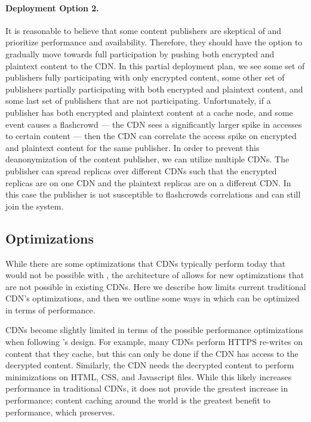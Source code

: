 \paragraph{Deployment Option 2.} 
It is reasonable to believe that some content publishers are skeptical of \system{} and prioritize performance 
and availability.  Therefore, they should have the option to gradually move towards full participation by pushing 
both encrypted and plaintext content to the CDN.  In this partial deployment plan, we see some set of publishers 
fully participating with only encrypted content, some other set of publishers partially participating with both 
encrypted and plaintext content, and some last set of publishers that are not participating.  Unfortunately, if 
a publisher has both encrypted and plaintext content at a cache node, and some event causes a flashcrowd --- 
the CDN sees a significantly larger spike in accesses to certain content --- then the CDN can correlate the access 
spike on encrypted and plaintext content for the same publisher.  In order to prevent this deanonymization of the 
content publisher, we can utilize multiple CDNs.  The publisher can spread replicas over different CDNs such that 
the encrypted replicas are on one CDN and the plaintext replicas are on a different CDN.  In this case the publisher 
is not susceptible to flashcrowds correlations and can still join the system.

\subsection{Optimizations}
\label{sec:optimizations}
While there are some optimizations that CDNs typically perform today that would not be possible with \system{}, the architecture 
of \system{} allows for new optimizations that are not possible in existing CDNs.  Here we describe how \system{} limits 
current traditional CDN's optimizations, and then we outline some ways in which \system{} 
can be optimized in terms of performance.

CDNs become slightly limited in terms of the possible performance optimizations when following \system{}'s design.  For example, 
many CDNs perform HTTPS re-writes on content that they cache, but this can only be done if the CDN has access to the 
decrypted content.  Similarly, the CDN needs the decrypted content to perform minimizations on HTML, CSS, and Javascript 
files.  While this likely increases performance in traditional CDNs, it does not provide the greatest increase in performance; 
content caching around the world is the greatest benefit to performance, which \system{} preserves.

